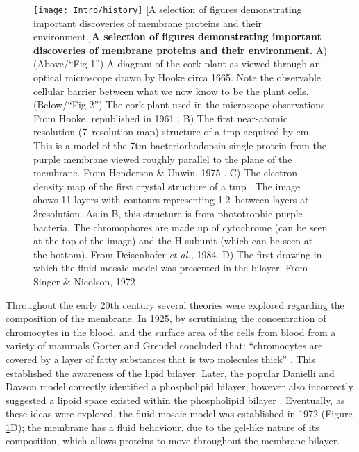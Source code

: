 \begin{figure}[ht!]
\centering
\texttt{[image: Intro/history]}
		[A selection of figures demonstrating important discoveries of membrane proteins and their environment.]{\textbf{A selection of figures demonstrating important discoveries of membrane proteins and their environment.}
		A) (Above/``Fig 1'') A diagram of the cork plant as viewed through an optical microscope drawn by Hooke circa 1665.
		Note the observable cellular barrier between what we now know to be the plant cells.
		(Below/``Fig 2'') The cork plant used in the microscope observations.
		From Hooke, republished in 1961 \cite{hooke1961micrographia}.
		B) The first near\--atomic resolution (7\angstrom~resolution map) structure of a \gls{tmp} acquired by \gls{em}.
		This is a model of the 7\gls{tm} bacteriorhodopsin single protein from the purple membrane viewed roughly parallel to the plane of the membrane.
		From Henderson \& Unwin, 1975 \cite{Henderson1975}.
		C) The electron density map of the first crystal structure of a \gls{tmp} \cite{Deisenhofer1984}.
		The image shows 11 layers with contours representing 1.2\angstrom~between layers at 3\angstrom resolution.
		As in B, this structure is from phototrophic purple bacteria.
		The chromophores are made up of cytochrome (can be seen at the top of the image) and the H\--subunit (which can be seen at the bottom).
		From Deisenhofer \textit{et al.,} 1984.
		D) The first drawing in which the fluid mosaic model was presented in the bilayer.
		From Singer \& Nicolson, 1972 \cite{Singer1972}
		}

\label{fig:history}
\end{figure}

Throughout the early 20th century several theories were explored regarding the composition of the membrane.
In 1925, by scrutinising the concentration of chromocytes in the blood, and the surface area of the cells from blood from a variety of mammals Gorter and Grendel concluded that: ``chromocytes are covered by a layer of fatty substances that is two molecules thick'' \cite{Gorter1925}.
This established the awareness of the lipid bilayer.
Later, the popular Danielli and Davson model correctly identified a phospholipid bilayer, however also incorrectly suggested a lipoid space existed within the phospholipid bilayer \cite{Danielli1935}.
Eventually, as these ideas were explored, the fluid mosaic model was established in 1972 (Figure \ref{fig:history}D)\cite{Singer1972}; the membrane has a fluid behaviour, due to the gel\--like nature of its composition, which allows proteins to move throughout the membrane bilayer.

